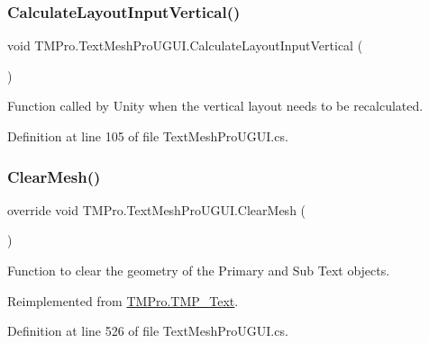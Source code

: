 \subsubsection{\texorpdfstring{CalculateLayoutInputVertical()}{CalculateLayoutInputVertical()}}
{\footnotesize\ttfamily void T\+M\+Pro.\+Text\+Mesh\+Pro\+U\+G\+U\+I.\+Calculate\+Layout\+Input\+Vertical (\begin{DoxyParamCaption}{ }\end{DoxyParamCaption})}



Function called by Unity when the vertical layout needs to be recalculated. 



Definition at line 105 of file Text\+Mesh\+Pro\+U\+G\+U\+I.\+cs.

\mbox{\label{class_t_m_pro_1_1_text_mesh_pro_u_g_u_i_a2b3b3a1a8d320d9f39751e7f05b1b2be}} 
\subsubsection{\texorpdfstring{ClearMesh()}{ClearMesh()}}
{\footnotesize\ttfamily override void T\+M\+Pro.\+Text\+Mesh\+Pro\+U\+G\+U\+I.\+Clear\+Mesh (\begin{DoxyParamCaption}{ }\end{DoxyParamCaption})\hspace{0.3cm}{\ttfamily [virtual]}}



Function to clear the geometry of the Primary and Sub Text objects. 



Reimplemented from \mbox{\hyperlink{class_t_m_pro_1_1_t_m_p___text_a9bd7b659f2a1b2feb48f3b3008d09ee6}{T\+M\+Pro.\+T\+M\+P\+\_\+\+Text}}.



Definition at line 526 of file Text\+Mesh\+Pro\+U\+G\+U\+I.\+cs.

\mbox{\label{class_t_m_pro_1_1_text_mesh_pro_u_g_u_i_a585823ae58e0b54f1497ced737567a03}} 
